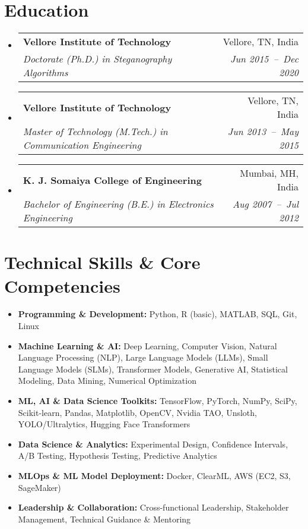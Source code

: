 \documentclass[a4paper,11pt]{article}
\makeatletter
\newcommand{\resumeSubheading}[4]{
  \vspace{-1pt}\item
    \begin{tabular*}{0.97\textwidth}[t]{l@{\extracolsep{\fill}}r}
      \textbf{#1} & #2 \\
      \textit{\small#3} & \textit{\small #4} \\
    \end{tabular*}\vspace{-5pt}
}
\newcommand{\resumeSubHeadingListStart}{\begin{itemize}[leftmargin=*]}
\newcommand{\resumeSubHeadingListEnd}{\end{itemize}}
\makeatother
\begin{document}
\section{Education}
  \resumeSubHeadingListStart
    \resumeSubheading
      {Vellore Institute of Technology}{Vellore, TN, India}
      {Doctorate (Ph.D.) in Steganography Algorithms}{Jun 2015~--~Dec 2020}
    \resumeSubheading
      {Vellore Institute of Technology}{Vellore, TN, India}
      {Master of Technology (M.Tech.) in Communication Engineering}{Jun 2013~--~May 2015}
    \resumeSubheading
      {K. J. Somaiya College of Engineering}{Mumbai, MH, India}
      {Bachelor of Engineering (B.E.) in Electronics Engineering}{Aug 2007~--~Jul 2012}
  \resumeSubHeadingListEnd

\section{Technical Skills \& Core Competencies}
	\begin{itemize}[leftmargin=*, itemsep = -2pt]
    \item{\textbf{Programming \& Development:} Python, R (basic), MATLAB, SQL, Git, Linux}
    \item{\textbf{Machine Learning \& AI:} Deep Learning, Computer Vision, Natural Language Processing (NLP), Large Language Models (LLMs), Small Language Models (SLMs), Transformer Models, Generative AI, Statistical Modeling, Data Mining, Numerical Optimization} 
		\item{\textbf{ML, AI \& Data Science Toolkits:} TensorFlow, PyTorch, NumPy, SciPy, Scikit-learn, Pandas, Matplotlib, OpenCV, Nvidia TAO, Unsloth, YOLO/Ultralytics, Hugging Face Transformers}
		\item {\textbf{Data Science \& Analytics:} Experimental Design, Confidence Intervals, A/B Testing, Hypothesis Testing, Predictive Analytics}
		\item{\textbf{MLOps \& ML Model Deployment:} Docker, ClearML, AWS (EC2, S3, SageMaker)}
    \item{\textbf{Leadership \& Collaboration:} Cross-functional Leadership, Stakeholder Management, Technical Guidance \& Mentoring}
    
	\end{itemize}

\end{document}

